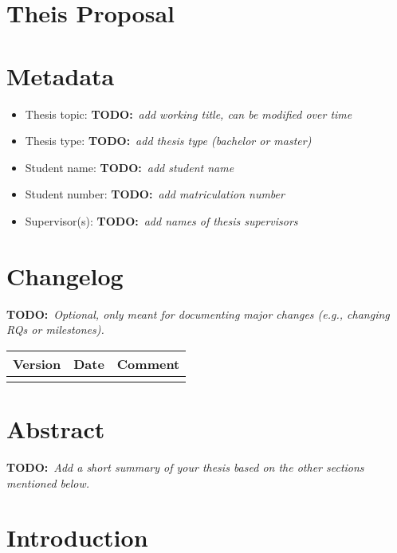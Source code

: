 \documentclass[pdftex,11pt,a4paper]{article}
\newcommand{\todo}[1]{{\textbf{TODO:}\ \textit{#1}}} %
\begin{document}
\section*{Theis Proposal}

\section{Metadata}

\begin{itemize}[itemsep=-1ex]
	\item Thesis topic: \todo{add working title, can be modified over time}
	\item Thesis type: \todo{add thesis type (bachelor or master)}
	\item Student name: \todo{add student name}
	\item Student number: \todo{add matriculation number}
	\item Supervisor(s): \todo{add names of thesis supervisors}
\end{itemize}


\section{Changelog}

\todo{Optional, only meant for documenting major changes (e.g., changing RQs or milestones).}

\begin{table}[ht]
\centering
\begin{tabular}{|l|l|l|}
\hline
\textbf{Version} & \textbf{Date} & \textbf{Comment} \\ \hline
 & & \\ \hline
\end{tabular}
\end{table}


\section{Abstract}

\todo{Add a short summary of your thesis based on the other sections mentioned below.}


\section{Introduction}
\end{document}
